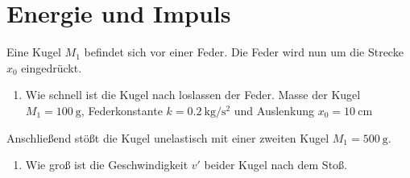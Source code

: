 \section{Energie und Impuls}
Eine Kugel $M_1$ befindet sich vor einer Feder.
Die Feder wird nun um die Strecke $x_0$ eingedrückt.
\begin{enumerate}
\item{ Wie schnell ist die Kugel nach loslassen der Feder. Masse der Kugel $M_1=\SI{100}{\gram}$,
Federkonstante $k=\SI{0.2}{\kilo\gram\per\square\second}$ und Auslenkung $x_0=\SI{10}{\centi\meter}$}
\end{enumerate}
Anschließend stößt die Kugel unelastisch mit einer zweiten Kugel $M_1=\SI{500}{\gram}$. %
\begin{enumerate}
\item {Wie groß ist die Geschwindigkeit $v'$ beider Kugel nach dem Stoß.}
\end{enumerate}
